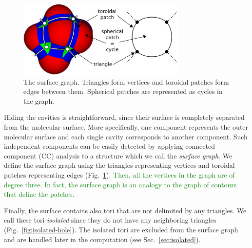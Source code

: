 
\begin{figure}[htb]
  \centering
  \includegraphics[width=3.3in]{image/graph.png}
  \caption{The surface graph.
	Triangles form vertices and toroidal patches form edges between them.
	Spherical patches are represented as cycles in the graph.}
	\label{fig:graph}
\end{figure}

Hiding the cavities is straightforward, since their surface is completely separated from the molecular surface.
More specifically, one component represents the outer molecular surface and each single cavity corresponds to another component.
Such independent components can be easily detected by applying connected component (CC) analysis to a structure which we call the \textit{surface graph}.
We define the surface graph using the triangles representing vertices and toroidal patches representing edges 
(Fig.~\ref{fig:graph}).
\textcolor{green}{
Then, all the vertices in the graph are of degree three.
In fact, the surface graph is an analogy to the graph of contours that define the patches.
}

Finally, the surface contains also tori that are not delimited by any triangles.
We call these tori \textit{isolated} since they do not have any neighboring triangles (Fig.~\ref{fig:isolated-hole}).
The isolated tori are excluded from the surface graph and are handled later in the computation (see Sec.~\ref{sec:isolated}).

